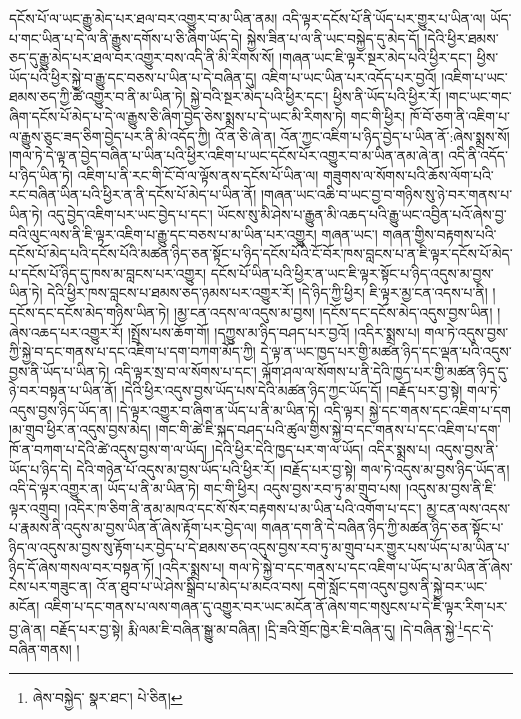 དངོས་པོ་ལ་ཡང་རྒྱུ་མེད་པར་ཐལ་བར་འགྱུར་བ་མ་ཡིན་ནམ། འདི་ལྟར་དངོས་པོ་ནི་ཡོད་པར་གྱུར་པ་ཡིན་ལ། ཡོད་པ་གང་ཡིན་པ་དེ་ལ་ནི་རྒྱུས་དགོས་པ་ཅི་ཞིག་ཡོད་དེ། སྐྱེས་ཟིན་པ་ལ་ནི་ཡང་བསྐྱེད་དུ་མེད་དོ། །དེའི་ཕྱིར་ཐམས་ཅད་དུ་རྒྱུ་མེད་པར་ཐལ་བར་འགྱུར་བས་འདི་ནི་མི་རིགས་སོ། །གཞན་ཡང་ཇི་ལྟར་སྔར་མེད་པའི་ཕྱིར་དང་། ཕྱིས་ཡོད་པའི་ཕྱིར་སྐྱེ་བ་རྒྱུ་དང་བཅས་པ་ཡིན་པ་དེ་བཞིན་དུ། འཇིག་པ་ཡང་ཡིན་པར་འདོད་པར་བྱའོ། །འཇིག་པ་ཡང་ཐམས་ཅད་ཀྱི་ཚེ་འགྱུར་བ་ནི་མ་ཡིན་ཏེ། སྐྱེ་བའི་སྔར་མེད་པའི་ཕྱིར་དང་། ཕྱིས་ནི་ཡོད་པའི་ཕྱིར་རོ། །གང་ཡང་གང་ཞིག་དངོས་པོ་མེད་པ་དེ་ལ་རྒྱུས་ཅི་ཞིག་བྱེད་ཅེས་སྨྲས་པ་དེ་ཡང་མི་རིགས་ཏེ། གང་གི་ཕྱིར། ཁོ་བོ་ཅག་ནི་འཇིག་པ་ལ་རྒྱུས་ཅུང་ཟད་ཅིག་བྱེད་པར་ནི་མི་འདོད་ཀྱི། འོ་ན་ཅི་ཞེ་ན། འོན་ཀྱང་འཇིག་པ་ཉིད་བྱེད་པ་ཡིན་ནོ་:ཞེས་སྨྲས་སོ། །གལ་ཏེ་དེ་ལྟ་ན་བྱེད་བཞིན་པ་ཡིན་པའི་ཕྱིར་འཇིག་པ་ཡང་དངོས་པོར་འགྱུར་བ་མ་ཡིན་ནམ་ཞེ་ན། འདི་ནི་འདོད་པ་ཉིད་ཡིན་ཏེ། འཇིག་པ་ནི་རང་གི་ངོ་བོ་ལ་ལྟོས་ནས་དངོས་པོ་ཡིན་ལ། གཟུགས་ལ་སོགས་པའི་ཆོས་ལོག་པའི་རང་བཞིན་ཡིན་པའི་ཕྱིར་ན་ནི་དངོས་པོ་མེད་པ་ཡིན་ནོ། །གཞན་ཡང་འཆི་བ་ཡང་བྱ་བ་གཉིས་སུ་ཉེ་བར་གནས་པ་ཡིན་ཏེ། འདུ་བྱེད་འཇིག་པར་ཡང་བྱེད་པ་དང་། ཡོངས་སུ་མི་ཤེས་པ་རྒྱུན་མི་འཆད་པའི་རྒྱུ་ཡང་འབྱིན་པའོ་ཞེས་བྱ་བའི་ལུང་ལས་ནི་ཇི་ལྟར་འཇིག་པ་རྒྱུ་དང་བཅས་པ་མ་ཡིན་པར་འགྱུར། གཞན་ཡང་། གཞན་གྱིས་བརྟགས་པའི་དངོས་པོ་མེད་པའི་དངོས་པོའི་མཚན་ཉིད་ཅན་སྟོང་པ་ཉིད་དངོས་པོའི་ངོ་བོར་ཁས་བླངས་པ་ན་ཇི་ལྟར་དངོས་པོ་མེད་པ་དངོས་པོ་ཉིད་དུ་ཁས་མ་བླངས་པར་འགྱུར། དངོས་པོ་ཡིན་པའི་ཕྱིར་ན་ཡང་ཇི་ལྟར་སྟོང་པ་ཉིད་འདུས་མ་བྱས་ཡིན་ཏེ། དེའི་ཕྱིར་ཁས་བླངས་པ་ཐམས་ཅད་ཉམས་པར་འགྱུར་རོ། །དེ་ཉིད་ཀྱི་ཕྱིར། ཇི་ལྟར་མྱ་ངན་འདས་པ་ནི། །དངོས་དང་དངོས་མེད་གཉིས་ཡིན་ཏེ། །མྱ་ངན་འདས་ལ་འདུས་མ་བྱས། །དངོས་དང་དངོས་མེད་འདུས་བྱས་ཡིན། །ཞེས་འཆད་པར་འགྱུར་རོ། །སྤྲོས་པས་ཆོག་གོ། །དཀྱུས་མ་ཉིད་བཤད་པར་བྱའོ། །འདིར་སྨྲས་པ། གལ་ཏེ་འདུས་བྱས་ཀྱི་སྐྱེ་བ་དང་གནས་པ་དང་འཇིག་པ་དག་བཀག་མོད་ཀྱི། དེ་ལྟ་ན་ཡང་ཁྱད་པར་གྱི་མཚན་ཉིད་དང་ལྡན་པའི་འདུས་བྱས་ནི་ཡོད་པ་ཡིན་ཏེ། འདི་ལྟར་སྲ་བ་ལ་སོགས་པ་དང་། ལྐོག་ཤལ་ལ་སོགས་པ་ནི་དེའི་ཁྱད་པར་གྱི་མཚན་ཉིད་དུ་ཉེ་བར་བསྟན་པ་ཡིན་ནོ། །དེའི་ཕྱིར་འདུས་བྱས་ཡོད་པས་དེའི་མཚན་ཉིད་ཀྱང་ཡོད་དོ། །བརྗོད་པར་བྱ་སྟེ། གལ་ཏེ་འདུས་བྱས་ཉིད་ཡོད་ན། །དེ་ལྟར་འགྱུར་བ་ཞིག་ན་ཡོད་པ་ནི་མ་ཡིན་ཏེ། འདི་ལྟར། སྐྱེ་དང་གནས་དང་འཇིག་པ་དག །མ་གྲུབ་ཕྱིར་ན་འདུས་བྱས་མེད། །གང་གི་ཚེ་ཇི་སྐད་བཤད་པའི་ཚུལ་གྱིས་སྐྱེ་བ་དང་གནས་པ་དང་འཇིག་པ་དག་ཁོ་ན་བཀག་པ་དེའི་ཚེ་འདུས་བྱས་ག་ལ་ཡོད། །དེའི་ཕྱིར་དེའི་ཁྱད་པར་ག་ལ་ཡོད། འདིར་སྨྲས་པ། འདུས་བྱས་ནི་ཡོད་པ་ཉིད་དེ། དེའི་གཉེན་པོ་འདུས་མ་བྱས་ཡོད་པའི་ཕྱིར་རོ། །བརྗོད་པར་བྱ་སྟེ། གལ་ཏེ་འདུས་མ་བྱས་ཉིད་ཡོད་ན། འདི་དེ་ལྟར་འགྱུར་ན། ཡོད་པ་ནི་མ་ཡིན་ཏེ། གང་གི་ཕྱིར། འདུས་བྱས་རབ་ཏུ་མ་གྲུབ་པས། །འདུས་མ་བྱས་ནི་ཇི་ལྟར་འགྲུབ། །འདིར་ཁ་ཅིག་ནི་ནམ་མཁའ་དང་སོ་སོར་བརྟགས་པ་མ་ཡིན་པའི་འགོག་པ་དང་། མྱ་ངན་ལས་འདས་པ་རྣམས་ནི་འདུས་མ་བྱས་ཡིན་ནོ་ཞེས་རྟོག་པར་བྱེད་ལ། གཞན་དག་ནི་དེ་བཞིན་ཉིད་ཀྱི་མཚན་ཉིད་ཅན་སྟོང་པ་ཉིད་ལ་འདུས་མ་བྱས་སུ་རྟོག་པར་བྱེད་པ་དེ་ཐམས་ཅད་འདུས་བྱས་རབ་ཏུ་མ་གྲུབ་པར་གྱུར་པས་ཡོད་པ་མ་ཡིན་པ་ཉིད་དོ་ཞེས་གསལ་བར་བསྟན་ཏོ། །འདིར་སྨྲས་པ། གལ་ཏེ་སྐྱེ་བ་དང་གནས་པ་དང་འཇིག་པ་ཡོད་པ་མ་ཡིན་ནོ་ཞེས་ངེས་པར་གཟུང་ན། འོ་ན་ཐུབ་པ་ཡེ་ཤེས་སྒྲིབ་པ་མེད་པ་མངའ་བས། དགེ་སློང་དག་འདུས་བྱས་ནི་སྐྱེ་བར་ཡང་མངོན། འཇིག་པ་དང་གནས་པ་ལས་གཞན་དུ་འགྱུར་བར་ཡང་མངོན་ནོ་ཞེས་གང་གསུངས་པ་དེ་ཇི་ལྟར་རིག་པར་བྱ་ཞེ་ན། བརྗོད་པར་བྱ་སྟེ། རྨི་ལམ་ཇི་བཞིན་སྒྱུ་མ་བཞིན། །དྲི་ཟའི་གྲོང་ཁྱེར་ཇི་བཞིན་དུ། །དེ་བཞིན་སྐྱེ་\footnote{ཞེས་བསྐྱེད་  སྣར་ཐང་།  པེ་ཅིན། }དང་དེ་བཞིན་གནས། །
